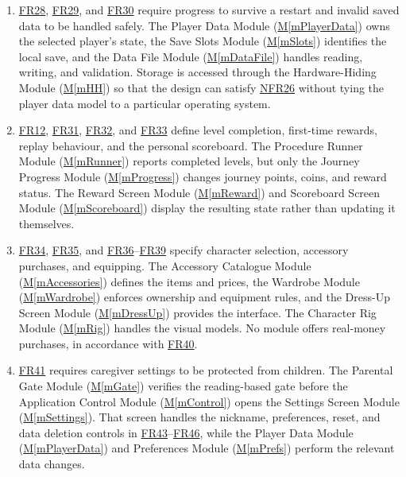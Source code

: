 \documentclass[10pt, titlepage]{article}
\newcommand{\srsurl}{https://team-hindsight.github.io/ophthamology-game/SRS/SRS.pdf}
\newcommand{\srsitemref}[2]{\href{\srsurl\#nameddest=#1}{#2}}
\newcommand{\mref}[1]{\texorpdfstring{\hyperref[md:#1]{M\ref*{#1}}}{M\ref*{#1}}}
\begin{document}
\begin{enumerate}[leftmargin=*, itemsep=0.5em, parsep=0.15em]
\item \srsitemref{FR_PersistState}{FR28}, \srsitemref{FR_RestoreState}{FR29},
  and \srsitemref{FR_CorruptData}{FR30} require progress to survive a restart
  and invalid saved data to be handled safely. The Player Data Module
  (\mref{mPlayerData}) owns the selected player's state, the Save Slots Module
  (\mref{mSlots}) identifies the local save, and the Data File Module
  (\mref{mDataFile}) handles reading, writing, and validation. Storage is
  accessed through the Hardware-Hiding Module (\mref{mHH}) so that the design
  can satisfy \srsitemref{NFR_DataProtection}{NFR26} without tying the player
  data model to a particular operating system.

\item \srsitemref{FR_LevelEnd}{FR12}, \srsitemref{FR_FirstReward}{FR31},
  \srsitemref{FR_NoDuplicateReward}{FR32}, and \srsitemref{FR_Scoreboard}{FR33}
  define level completion, first-time rewards, replay behaviour, and the
  personal scoreboard. The Procedure Runner Module (\mref{mRunner}) reports
  completed levels, but only the Journey Progress Module (\mref{mProgress})
  changes journey points, coins, and reward status. The Reward Screen Module
  (\mref{mReward}) and Scoreboard Screen Module (\mref{mScoreboard}) display
  the resulting state rather than updating it themselves.

\item \srsitemref{FR_ChooseCharacter}{FR34},
  \srsitemref{FR_DiverseCharacters}{FR35}, and
  \srsitemref{FR_Shop}{FR36}--\srsitemref{FR_Equip}{FR39} specify character
  selection, accessory purchases, and equipping. The Accessory Catalogue
  Module (\mref{mAccessories}) defines the items and prices, the Wardrobe
  Module (\mref{mWardrobe}) enforces ownership and equipment rules, and the
  Dress-Up Screen Module (\mref{mDressUp}) provides the interface. The
  Character Rig Module (\mref{mRig}) handles the visual models. No module
  offers real-money purchases, in accordance with
  \srsitemref{FR_NoRealMoney}{FR40}.

\item \srsitemref{FR_ParentGate}{FR41} requires caregiver settings to be
  protected from children. The Parental Gate Module (\mref{mGate}) verifies
  the reading-based gate before the Application Control Module
  (\mref{mControl}) opens the Settings Screen Module (\mref{mSettings}). That
  screen handles the nickname, preferences, reset, and data deletion controls
  in \srsitemref{FR_Nickname}{FR43}--\srsitemref{FR_ClearAllData}{FR46}, while
  the Player Data Module (\mref{mPlayerData}) and Preferences Module
  (\mref{mPrefs}) perform the relevant data changes.


\end{enumerate}
\end{document}
